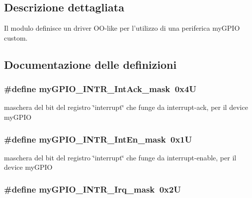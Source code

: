 \subsection{Descrizione dettagliata}
Il modulo definisce un driver O\+O-\/like per l'utilizzo di una periferica my\+G\+P\+I\+O custom. 

\subsection{Documentazione delle definizioni}
\hypertarget{group__my_g_p_i_o_gaa760b8397e6372e48c1008c2ba8d7387}{
\subsubsection[{my\+G\+P\+I\+O\+\_\+\+I\+N\+T\+R\+\_\+\+Int\+Ack\+\_\+mask}]{\setlength{\rightskip}{0pt plus 5cm}\#define my\+G\+P\+I\+O\+\_\+\+I\+N\+T\+R\+\_\+\+Int\+Ack\+\_\+mask~0x4\+U}}\label{group__my_g_p_i_o_gaa760b8397e6372e48c1008c2ba8d7387}


maschera del bit del registro \char`\"{}interrupt\char`\"{} che funge da interrupt-\/ack, per il device my\+G\+P\+I\+O 

\hypertarget{group__my_g_p_i_o_ga0ba32e2adf874ed7216c5993369153e1}{
\subsubsection[{my\+G\+P\+I\+O\+\_\+\+I\+N\+T\+R\+\_\+\+Int\+En\+\_\+mask}]{\setlength{\rightskip}{0pt plus 5cm}\#define my\+G\+P\+I\+O\+\_\+\+I\+N\+T\+R\+\_\+\+Int\+En\+\_\+mask~0x1\+U}}\label{group__my_g_p_i_o_ga0ba32e2adf874ed7216c5993369153e1}


maschera del bit del registro \char`\"{}interrupt\char`\"{} che funge da interrupt-\/enable, per il device my\+G\+P\+I\+O 

\hypertarget{group__my_g_p_i_o_ga4cd02635783bc2a4ad7639cfb9fdb698}{
\subsubsection[{my\+G\+P\+I\+O\+\_\+\+I\+N\+T\+R\+\_\+\+Irq\+\_\+mask}]{\setlength{\rightskip}{0pt plus 5cm}\#define my\+G\+P\+I\+O\+\_\+\+I\+N\+T\+R\+\_\+\+Irq\+\_\+mask~0x2\+U}}\label{group__my_g_p_i_o_ga4cd02635783bc2a4ad7639cfb9fdb698}



